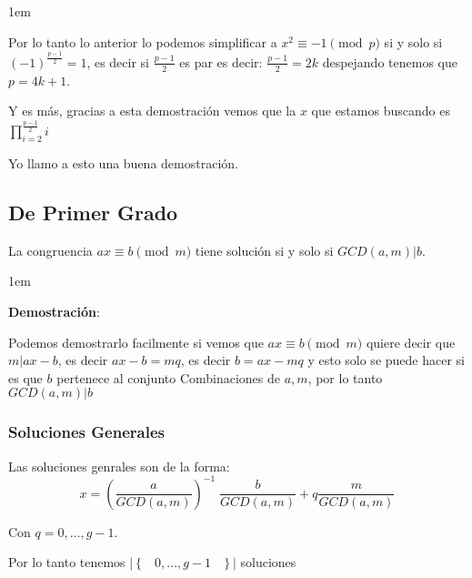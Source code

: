 \documentclass[12pt, fleqn]{report}                             %
\newenvironment{SmallIndentation}[1][0.75em]                    %
    {\begin{adjustwidth}{#1}{}\begin{footnotesize}}                 %
    {\end{footnotesize}\end{adjustwidth}}                           %
\DeclareMathOperator \Space {\quad}                             %
\DeclareMathOperator \MiniSpace {\;}                            %
\newcommand{\Set}[1]{\left\{ \MiniSpace #1 \MiniSpace \right\}} %
\newcommand{\Wrap}[1]{\left( #1 \right)}                        %
\newcommand{\pfrac}[2]{\Wrap{\dfrac{#1}{#2}}}                   %
\begin{document}
\begin{itemize}
\begin{SmallIndentation}[1em]
                    Por lo tanto lo anterior lo podemos simplificar a 
                    $x^2 \equiv -1 \pmod{p}$ si y solo si 
                    $(-1)^{\frac{p-1}{2}} = 1$, es decir si $\frac{p-1}{2}$ es par
                    es decir: $\frac{p-1}{2} = 2k$ despejando tenemos que 
                    $p=4k+1$.


                    Y es más, gracias a esta demostración vemos que la $x$ que estamos
                    buscando es $\prod_{i=2}^{\frac{p-1}{2}} i$
                    
                    Yo llamo a esto una buena demostración.

                \end{SmallIndentation}
            \end{itemize}



        \clearpage
        \subsection{De Primer Grado}

            La congruencia $ax \equiv b \pmod{m}$ tiene solución si y solo si 
            $GCD(a, m) | b$.

            \begin{SmallIndentation}[1em]
                \textbf{Demostración}:

                Podemos demostrarlo facilmente si vemos que $ax \equiv b \pmod{m}$ quiere decir
                que $m|ax -b$, es decir $ax-b=mq$, es decir $b=ax-mq$ y esto solo se puede hacer
                si es que $b$ pertenece al conjunto Combinaciones de $a,m$, por lo tanto
                $GCD(a, m)|b$ 
            \end{SmallIndentation}


            \subsubsection{Soluciones Generales}

                Las soluciones genrales son de la forma:
                \begin{equation}
                    x = \pfrac{a}{GCD(a, m)}^{-1} \; \dfrac{b}{GCD(a, m)} + q\dfrac{m}{GCD(a, m)} 
                \end{equation}

                Con $q=0, \dots, g-1$.

                Por lo tanto tenemos $|\Set{0, \dots, g-1}|$ soluciones



        





       
\end{document}
